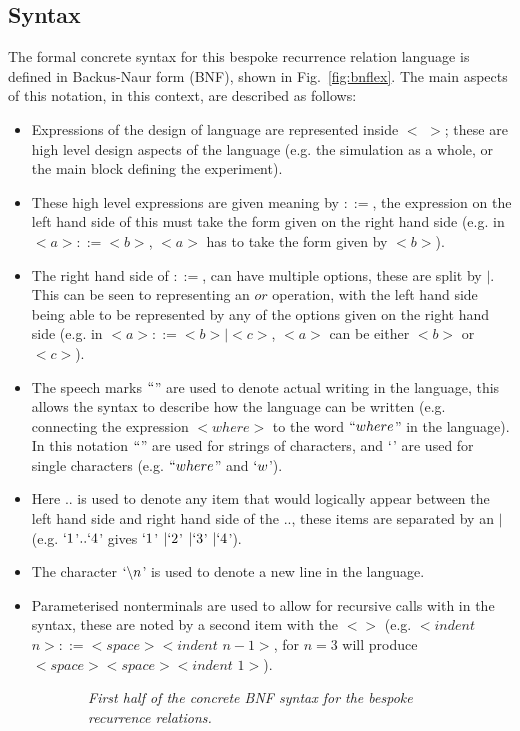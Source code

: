 \documentclass{article}
\begin{document}
\subsection{Syntax}
The formal concrete syntax for this bespoke recurrence relation language is defined in Backus-Naur form (BNF), shown in Fig.~\ref{fig:bnflex}. The main aspects of this notation, in this context, are described as follows:
\begin{itemize}
  \item Expressions of the design of language are represented inside $<$ $>$; these are high level design aspects of the language (e.g. the simulation as a whole, or the main block defining the experiment).
  \item These high level expressions are given meaning by $::=$, the expression on the left hand side of this must take the form given on the right hand side (e.g. in $<a> ::= <b>$, $<a>$ has to take the form given by $<b>$).  
  \item The right hand side of $::=$, can have multiple options, these are split by $|$. This can be seen to representing an $or$ operation, with the left hand side being able to be represented by any of the options given on the right hand side (e.g. in $<a> ::= <b> | <c>$, $<a>$ can be either $<b>$ or $<c>$). 
  \item The speech marks $``$'' are used to denote actual writing in the language, this allows the syntax to describe how the language can be written (e.g. connecting the expression $<where>$ to the word $``where$'' in the language). In this notation $``$'' are used for strings of characters, and $`$' are used for single characters (e.g. $``where$'' and $`w$').
  \item Here $..$ is used to denote any item that would logically appear between the left hand side and right hand side of the $..$, these items are separated by an $|$ (e.g. $`1$'$.. `4$' gives $`1$' $| `2$' $| `3$' $| `4$'). 
  \item The character $`\backslash n$' is used to denote  a new line in the language. 
  \item Parameterised nonterminals are used to allow for recursive calls with in the syntax, these are noted by a second item with the $<>$ (e.g.  $<indent$ $n> ::= <space> <indent$ $n-1>$, for $n=3$ will produce $<space><space><indent$ $1>$).
\end{itemize}
\begin{figure}[H]
	\centering
	\begin{subfigure}[b]{1\textwidth}
	
	\caption{\it First half of the concrete BNF syntax for the bespoke recurrence relations.}
        \label{fig:snt1}
	\end{subfigure}
	\caption*{}
\end{figure}
	
\end{document}

